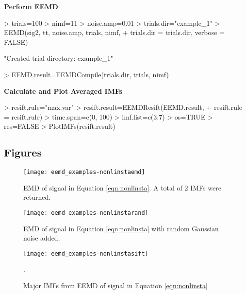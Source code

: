 \documentclass[12pt]{article}
\begin{document}
\textbf{Perform EEMD}

\begin{Schunk}
\begin{Sinput}
> trials=100
> nimf=11
> noise.amp=0.01
> trials.dir="example_1"
> EEMD(sig2, tt, noise.amp, trials, nimf, 
+     trials.dir = trials.dir, verbose = FALSE)
\end{Sinput}
\begin{Soutput}
[1] "Created trial directory: example_1"
\end{Soutput}
\begin{Sinput}
> EEMD.result=EEMDCompile(trials.dir, trials, nimf)
\end{Sinput}
\end{Schunk}

\textbf{Calculate and Plot Averaged IMFs}

\begin{Schunk}
\begin{Sinput}
> resift.rule="max.var"
> resift.result=EEMDResift(EEMD.result, 
+ resift.rule = resift.rule)
> time.span=c(0, 100)
> imf.list=c(3:7)
> os=TRUE
> res=FALSE
> PlotIMFs(resift.result)
\end{Sinput}
\end{Schunk}

\subsection{Figures}

\FloatBarrier

\begin{figure}[ht]
\begin{center}
\texttt{[image: eemd\_examples-nonlinstaemd]}
\end{center}
\caption{EMD of signal in Equation \ref{eqn:nonlinsta}.
A total of 2 IMFs were returned.}
\label{fig:nonlinstaemd}
\end{figure}

\begin{figure}[ht]
\begin{center}
\texttt{[image: eemd\_examples-nonlinstarand]}
\end{center}
\caption{EMD of signal in Equation \ref{eqn:nonlinsta} with random Gaussian noise added.}
\label{fig:nonlinstarand}
\end{figure}

\begin{figure}[ht]
\begin{center}
\texttt{[image: eemd\_examples-nonlinstasift]}
\end{center}
\caption{Major IMFs from EEMD of signal in Equation \ref{eqn:nonlinsta}}.
\label{fig:nonlinstasift}
\end{figure}
\end{document}
